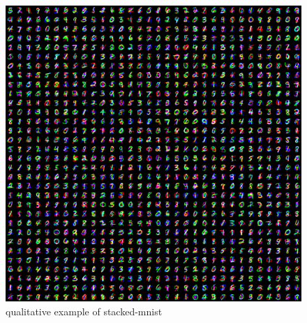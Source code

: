 {
\begin{figure}[h!]
    \newlength{\imgsize}
    \setlength{\imgsize}{0.2\linewidth} %
    
    \setlength{\tabcolsep}{0pt} %
    \renewcommand{\arraystretch}{0} %

    \newcommand{\qualitativeimg}[1]{%
        \texttt{[image: figures/qualitative/stacked-mnist-000008806/number-\#1.jpg]}%
    }
    \centering
    \includegraphics[width=\imgsize, trim=0px 0px 2048px 2048px]{figures/qualitative/stacked-mnist-000008806.png}
    \caption{qualitative example of stacked-mnist}
    \label{fig:stacked-mnist}
\end{figure}
}